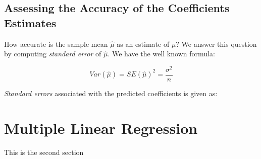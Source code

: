 \documentclass{article}
\begin{document}
	\subsection{Assessing the Accuracy of the Coefficients Estimates}
	How accurate is the sample mean $\hat{\mu}$ as an estimate of $\mu$? We answer this question by computing \textit{standard error} of $\hat{\mu}$. We have the well known formula:

	\begin{equation}
		Var(\hat{\mu}) = SE(\hat{\mu})^2 = \frac{\sigma^2}{n}
	\end{equation}

	\textit{Standard errors} associated with the predicted coefficients is given as:


	\section{Multiple Linear Regression}
	This is the second section
\end{document}
